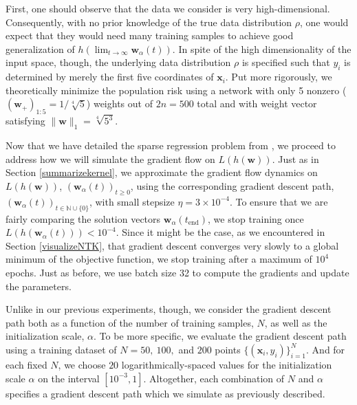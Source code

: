 \documentclass{article}
\begin{document}
First, one should observe that the data we consider is very high-dimensional. Consequently, with no prior knowledge of the true data distribution $\rho$, one would expect that they would need many training samples to achieve good generalization of $h(\lim_{t \to \infty} \boldsymbol{w}_{\alpha}(t))$. In spite of the high dimensionality of the input space, though, the underlying data distribution $\rho$ is specified such that $y_i$ is determined by merely the first five coordinates of $\boldsymbol{x}_i$. Put more rigorously, we theoretically minimize the population risk using a network with only 5 nonzero ($(\boldsymbol{w}_+)_{1:5} = 1/\sqrt[4]{5}$) weights out of $2n = 500$ total and with weight vector satisfying $\| \boldsymbol{w} \|_1 = \sqrt[4]{5^3}$.

Now that we have detailed the sparse regression problem from \cite{woodworth2020kernel}, we proceed to address how we will simulate the gradient flow on $L(h(\boldsymbol{w}))$. Just as in Section \ref{summarizekernel}, we approximate the gradient flow dynamics on $L(h(\boldsymbol{w}))$, $(\boldsymbol{w}_{\alpha}(t))_{t \geq 0}$, using the corresponding gradient descent path, $(\boldsymbol{w}_{\alpha}(t))_{t \in \mathbb{N} \cup \{ 0\}}$, with small stepsize $\eta = 3 \times 10^{-4}$. To ensure that we are fairly comparing the solution vectors $\boldsymbol{w}_{\alpha}(t_{\text{end}})$, we stop training once $L(h(\boldsymbol{w}_{\alpha}(t))) < 10^{-4}$. Since it might be the case, as we encountered in Section \ref{visualizeNTK}, that gradient descent converges very slowly to a global minimum of the objective function, we stop training after a maximum of $10^4$ epochs. Just as before, we use batch size 32 to compute the gradients and update the parameters.

Unlike in our previous experiments, though, we consider the gradient descent path both as a function of the number of training samples, $N$, as well as the initialization scale, $\alpha$. To be more specific, we evaluate the gradient descent path using a training dataset of $N = 50, \ 100,$ and $200$ points $\{ (\boldsymbol{x}_i, y_i) \}_{i=1}^N$. And for each fixed $N$, we choose $20$ logarithmically-spaced values for the initialization scale $\alpha$ on the interval $[10^{-3}, 1]$. Altogether, each combination of $N$ and $\alpha$ specifies a gradient descent path which we simulate as previously described.
\end{document}

